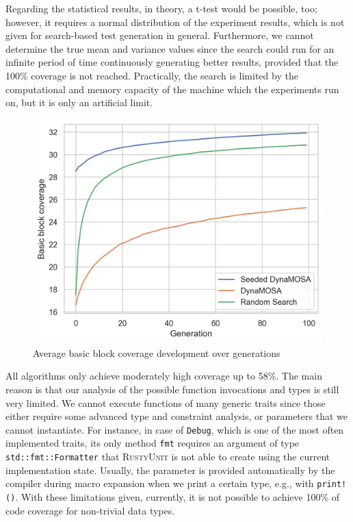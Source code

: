 \documentclass[paper=a4,%
  twoside,%
  BCOR4mm,%
  abstract=true,%
  toc=bibliography,%
  chapterprefix=true,%
  toc=bibliographynumbered,%
  open=right,%
  english,%
  pagesize=pdftex]{scrreprt}
\newcommand{\tech}{\textsc{RustyUnit}\xspace}
\begin{document}
Regarding the statistical results, in theory, a t-test would be possible, too; however, it requires a normal distribution of the experiment results, which is not given for search-based test generation in general. Furthermore, we cannot determine the true mean and variance values since the search could run for an infinite period of time continuously generating better results, provided that the 100\% coverage is not reached. Practically, the search is limited by the computational and memory capacity of the machine which the experiments run on, but it is only an artificial limit.

\begin{figure}[ht]
\caption{\label{fig:coverage-lineplot}Average basic block coverage development over generations}
\centering
\includegraphics[width=\textwidth]{experiments/coverage-over-time-crates}
\end{figure}

All algorithms only achieve moderately high coverage up to 58\%. The main reason is that our analysis of the possible function invocations and types is still very limited. We cannot execute functions of many generic traits since those either require some advanced type and constraint analysis, or parameters that we cannot instantiate. For instance, in case of \texttt{Debug}, which is one of the most often implemented traits, its only method \texttt{fmt} requires an argument of type \texttt{std::fmt::Formatter} that \tech is not able to create using the current implementation state. Usually, the parameter is provided automatically by the compiler during macro expansion when we print a certain type, e.g., with \texttt{print!()}. With these limitations given, currently, it is not possible to achieve 100\% of code coverage for non-trivial data types.
\end{document}
